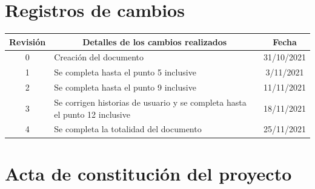 \documentclass[
11pt, %
]{charter}
\begin{document}
\maketitle
\thispagestyle{empty}
\pagebreak


\thispagestyle{empty}
{\setlength{\parskip}{0pt}
\tableofcontents{}
}
\pagebreak


\section*{Registros de cambios}
\label{sec:registro}


\begin{table}[ht]
\label{tab:registro}
\centering
\begin{tabularx}{\linewidth}{@{}|c|X|c|@{}}
\hline
\rowcolor[HTML]{C0C0C0} 
Revisión & \multicolumn{1}{c|}{\cellcolor[HTML]{C0C0C0}Detalles de los cambios realizados} & Fecha      \\ \hline
0      & Creación del documento                                 & 31/10/2021 \\ \hline
1      & Se completa hasta el punto 5 inclusive                 & 3/11/2021 \\ \hline
2      & Se completa hasta el punto 9 inclusive
& 11/11/2021 \\ \hline
3      & Se corrigen historias de usuario y se completa hasta el punto 12 inclusive
& 18/11/2021 \\ \hline
4      & Se completa la totalidad del documento
& 25/11/2021 \\ \hline
\end{tabularx}
\end{table}

\pagebreak



\section*{Acta de constitución del proyecto}
\label{sec:acta}
\end{document}
